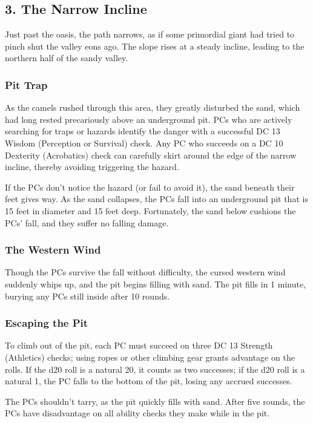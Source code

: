\documentclass[10pt,a4paper,twoside,bg=print,twocolumn,openany,nodeprecatedcode]{dndbook}
\begin{document}
\subsection{3. The Narrow Incline}
\begin{DndReadAloud}{}
Just past the oasis, the path narrows, as if some primordial giant had tried to pinch shut the valley eons ago. The slope rises at a steady incline, leading to the northern half of the sandy valley.

\end{DndReadAloud}

\subsubsection{Pit Trap}
As the camels rushed through this area, they greatly disturbed the sand, which had long rested precariously above an underground pit. PCs who are actively searching for traps or hazards identify the danger with a successful DC 13 Wisdom (Perception or Survival) check. Any PC who succeeds on a DC 10 Dexterity (Acrobatics) check can carefully skirt around the edge of the narrow incline, thereby avoiding triggering the hazard.

If the PCs don't notice the hazard (or fail to avoid it), the sand beneath their feet gives way. As the sand collapses, the PCs fall into an underground pit that is 15 feet in diameter and 15 feet deep. Fortunately, the sand below cushions the PCs' fall, and they suffer no falling damage.

\subsubsection{The Western Wind}
Though the PCs survive the fall without difficulty, the cursed western wind suddenly whips up, and the pit begins filling with sand. The pit fills in 1 minute, burying any PCs still inside after 10 rounds.

\subsubsection{Escaping the Pit}
To climb out of the pit, each PC must succeed on three DC 13 Strength (Athletics) checks; using ropes or other climbing gear grants advantage on the rolls. If the d20 roll is a natural 20, it counts as two successes; if the d20 roll is a natural 1, the PC falls to the bottom of the pit, losing any accrued successes.

The PCs shouldn't tarry, as the pit quickly fills with sand. After five rounds, the PCs have disadvantage on all ability checks they make while in the pit.
\end{document}
